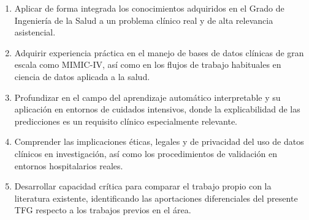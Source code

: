 \begin{enumerate}
  \item Aplicar de forma integrada los conocimientos adquiridos en el Grado de Ingeniería de la Salud a un problema clínico real y de alta relevancia asistencial.

  \item Adquirir experiencia práctica en el manejo de bases de datos clínicas de gran escala como MIMIC-IV, así como en los flujos de trabajo habituales en ciencia de datos aplicada a la salud.

  \item Profundizar en el campo del aprendizaje automático interpretable y su aplicación en entornos de cuidados intensivos, donde la explicabilidad de las predicciones es un requisito clínico especialmente relevante.

  \item Comprender las implicaciones éticas, legales y de privacidad del uso de datos clínicos en investigación, así como los procedimientos de validación en entornos hospitalarios reales.

  \item Desarrollar capacidad crítica para comparar el trabajo propio con la literatura existente, identificando las aportaciones diferenciales del presente TFG respecto a los trabajos previos en el área.
\end{enumerate}